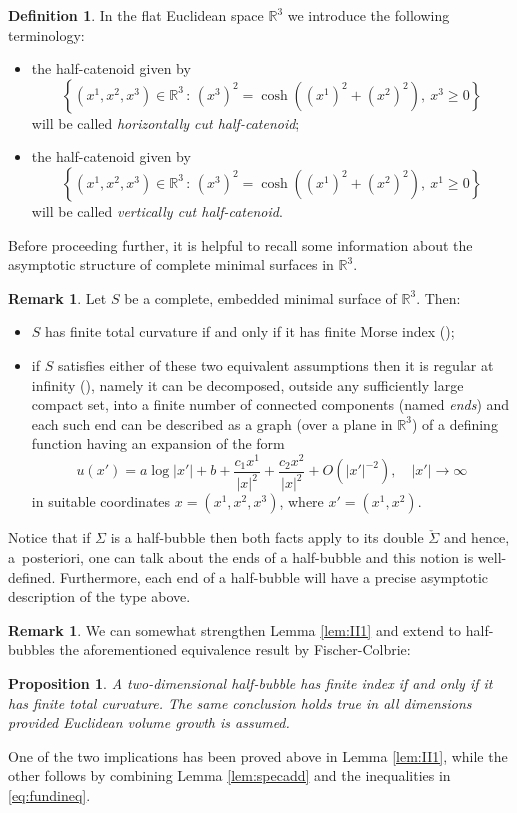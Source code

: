 \documentclass[JEP,XML,SOM,Unicode]{cedram}
\newcommand{\sep}{\,:\,}
\newtheorem{prop}[thm]{Proposition}
\theoremstyle{definition}
\newtheorem{definition}[thm]{Definition}
\newtheorem{rmk}[thm]{Remark}
\newcommand{\R}{\mathbb{R}}
\begin{document}
\begin{definition}\label{def:horcurvercut} In the flat Euclidean space $\R^3$ we introduce the following terminology:
\begin{itemize} \item{the half-catenoid given by
\[
\left\{(x^1, x^2, x^3)\in \R^3 \sep (x^3)^2=\cosh ((x^1)^2+(x^2)^2), \  x^3\geq 0 \right\}
\]
will be called \emph{horizontally cut half-catenoid};}
\item{the half-catenoid given by
\[
\left\{ (x^1, x^2, x^3)\in \R^3 \sep (x^3)^2=\cosh ((x^1)^2+(x^2)^2), \  x^1\geq 0 \right\}
\]
will be called \emph{vertically cut half-catenoid}.}
\end{itemize}
\end{definition}

Before proceeding further, it is helpful to recall some information about the asymptotic structure of complete minimal surfaces in $\R^3$.

\begin{rmk}\label{rem:reginf}
Let $S$ be a complete, embedded minimal surface of $\R^3$. Then:
\begin{itemize}
\item{$S$ has finite total curvature if and only if it has finite Morse index (\cf \cite{FC85});}
\item{if $S$ satisfies either of these two equivalent assumptions then it is regular at infinity (\cf \cite{Sc83}), namely it can be decomposed, outside any sufficiently large compact set, into a finite number of connected components (named \emph{ends}) and each such end can be described as a graph (over a plane in $\R^3$) of a defining function having an expansion of the form
\[
u(x')=a\log|x'|+b+\frac{c_1 x^1}{|x|^2}+\frac{c_2 x^2}{|x|^2}+O(|x'|^{-2}), \quad |x'|\to\infty
\]
in suitable coordinates $x=(x^1,x^2,x^3)$, where $x'=(x^1,x^2)$.
}
\end{itemize}
Notice that if $\Sigma$ is a half-bubble then both facts apply to its double $\check{\Sigma}$ and hence, a~post\-eriori, one can talk about the ends of a half-bubble and this notion is well-defined. Furthermore, each end of a half-bubble will have a precise asymptotic description of the type above.
\end{rmk}

\begin{rmk}
We can somewhat strengthen Lemma \ref{lem:II1} and extend to half-bubbles the aforementioned equivalence result by Fischer-Colbrie:
\end{rmk}
\begin{prop}\label{pro:equiv}
A two-dimensional half-bubble has finite index if and only if it has finite total curvature. The same conclusion holds true in all dimensions provided Euclidean volume growth is assumed.
\end{prop}
One of the two implications has been proved above in Lemma \ref{lem:II1}, while the other follows by combining Lemma \ref{lem:specadd} and the inequalities in \eqref{eq:fundineq}.
\end{document}
